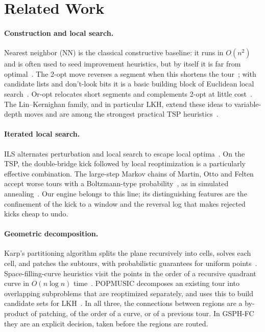 \documentclass[runningheads]{llncs}
\begin{document}
\section{Related Work}
\label{sec:related}

\paragraph{Construction and local search.} Nearest neighbor (NN) is the
classical constructive baseline: it runs in $O(n^2)$ and is often used
to seed improvement heuristics, but by itself it is far from
optimal~\cite{kizilatecs2013nearest}. The 2-opt move reverses a segment
when this shortens the tour~\cite{croes1958method}; with candidate lists
and don't-look bits it is a basic building block of Euclidean local
search~\cite{johnson1997tsp,bentley1992fast}. Or-opt relocates short
segments and complements 2-opt at little cost~\cite{or1976traveling}.
The Lin--Kernighan family, and in particular LKH, extend these ideas to
variable-depth moves and are among the strongest practical TSP
heuristics~\cite{lin1973effective,helsgaun2000effective,helsgaun2017extension}.

\paragraph{Iterated local search.} ILS alternates perturbation and local
search to escape local optima~\cite{lourencco2003ils}. On the TSP, the
double-bridge kick followed by local reoptimization is a particularly
effective combination. The large-step Markov chains of Martin, Otto and
Felten accept worse tours with a Boltzmann-type
probability~\cite{martin1991large}, as in simulated
annealing~\cite{kirkpatrick1983optimization}. Our engine belongs to this
line; its distinguishing features are the confinement of the kick to a
window and the reversal log that makes rejected kicks cheap to undo.

\paragraph{Geometric decomposition.} Karp's partitioning algorithm
splits the plane recursively into cells, solves each cell, and patches
the subtours, with probabilistic guarantees for uniform
points~\cite{karp1977probabilistic}. Space-filling-curve heuristics
visit the points in the order of a recursive quadrant curve in
$O(n\log n)$ time~\cite{bartholdi1982spacefilling}. POPMUSIC decomposes
an existing tour into overlapping subproblems that are reoptimized
separately, and uses this to build candidate sets for
LKH~\cite{taillard2019popmusic}. In all three, the connections between
regions are a by-product of patching, of the order of a curve, or of a
previous tour. In GSPH-FC they are an explicit decision, taken before
the regions are routed.
\end{document}

